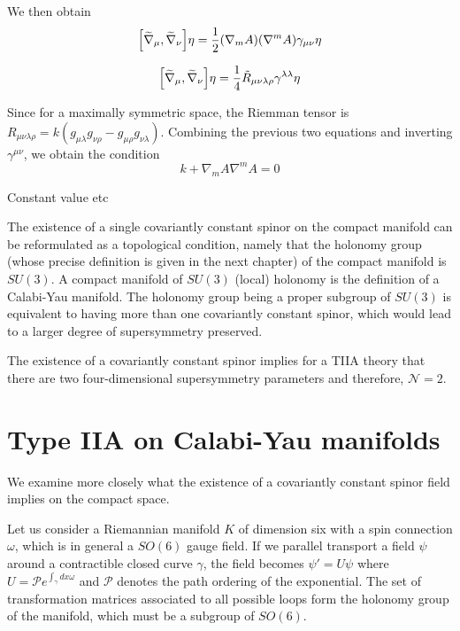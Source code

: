 We then obtain
\begin{equation}
  \qty[\widetilde \nabla_\mu,\widetilde \nabla_\nu]\eta=\frac{1}{2}\qty(\nabla_m A)\qty(\nabla^m A)\gamma_{\mu\nu}\eta
\end{equation}

\begin{equation}
  \qty[\widetilde \nabla_\mu,\widetilde \nabla_\nu]\eta=\frac{1}{4}\tilde R_{\mu\nu\lambda\rho} \gamma^{\lambda\lambda}\eta
\end{equation}

Since for a maximally symmetric space, the Riemman tensor is $R_{\mu\nu\lambda\rho}=k(g_{\mu\lambda}g_{\nu\rho}-g_{\mu\rho}g_{\nu\lambda})$.
Combining the previous two equations and inverting $\gamma^{\mu\nu}$, we obtain the condition
\begin{equation}
  k + \nabla_m A \nabla^m A =0
\end{equation}

Constant value etc

The existence of a single covariantly constant spinor on the compact manifold can be reformulated
as a topological condition, namely that the holonomy group (whose precise definition is given in the next chapter) of the compact manifold is $SU(3)$.
A compact manifold of $SU(3)$ (local) holonomy is the definition of a Calabi-Yau manifold.
The holonomy group being a proper subgroup of $SU(3)$ is equivalent to having more than one covariantly 
constant spinor, which would lead to a larger degree of supersymmetry preserved.

The existence of a covariantly constant spinor implies  for a TIIA theory that there are two four-dimensional supersymmetry parameters and therefore, $\mathcal N =2$.

\section{Type IIA on Calabi-Yau manifolds}
We examine more closely what the existence of a covariantly constant spinor field implies on the compact space. 

Let us consider a Riemannian manifold $K$ of dimension six with a spin connection $\omega$, which 
is in general a $SO(6)$ gauge field.
If we parallel transport a field $\psi$ around a contractible closed curve $\gamma$, the field becomes
$\psi'=U\psi$ where $U=\mathcal P e^{\int_\gamma dx \omega}$ and $\mathcal P$ denotes the path ordering of 
the exponential.
The set of transformation matrices associated to all possible loops form the holonomy group of the manifold, 
which must be a subgroup of $SO(6)$.

